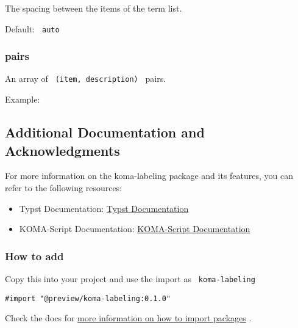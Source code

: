 The spacing between the items of the term list.

Default: \texttt{\ auto\ }

\subsubsection{pairs}\label{pairs}

An array of \texttt{\ (item,\ description)\ } pairs.

Example:

\begin{Shaded}
\begin{Highlighting}[]
\NormalTok{  (}
\NormalTok{    ([key 1],[description 1]),}
\NormalTok{    ([keyword 2],[description 2]),}
\NormalTok{  )}
\NormalTok{)}
\end{Highlighting}
\end{Shaded}

\subsection{Additional Documentation and
Acknowledgments}\label{additional-documentation-and-acknowledgments}

For more information on the koma-labeling package and its features, you
can refer to the following resources:

\begin{itemize}
\tightlist
\item
  Typst Documentation: \href{https://typst.app/docs}{Typst
  Documentation}
\item
  KOMA-Script Documentation:
  \href{https://ctan.org/pkg/koma-script}{KOMA-Script Documentation}
\end{itemize}

\subsubsection{How to add}\label{how-to-add}

Copy this into your project and use the import as
\texttt{\ koma-labeling\ }

\begin{verbatim}
#import "@preview/koma-labeling:0.1.0"
\end{verbatim}



Check the docs for
\href{https://typst.app/docs/reference/scripting/\#packages}{more
information on how to import packages} .

